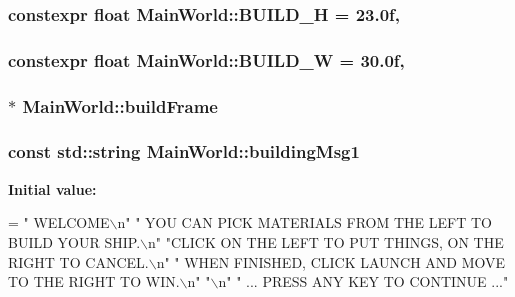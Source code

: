\subsubsection[{B\+U\+I\+L\+D\+\_\+\+H}]{\setlength{\rightskip}{0pt plus 5cm}constexpr float Main\+World\+::\+B\+U\+I\+L\+D\+\_\+\+H = 23.\+0f\hspace{0.3cm}{\ttfamily [static]}, {\ttfamily [private]}}\label{classMainWorld_abb38bf72b8a3c5ff6df3a43c7ebfba25}
\hypertarget{classMainWorld_a92c8b34eec78a999312c4b1d982d5f0c}{}
\subsubsection[{B\+U\+I\+L\+D\+\_\+\+W}]{\setlength{\rightskip}{0pt plus 5cm}constexpr float Main\+World\+::\+B\+U\+I\+L\+D\+\_\+\+W = 30.\+0f\hspace{0.3cm}{\ttfamily [static]}, {\ttfamily [private]}}\label{classMainWorld_a92c8b34eec78a999312c4b1d982d5f0c}
\hypertarget{classMainWorld_a10e4e51760423fa95cc57f4f5f8f5b76}{}
\subsubsection[{build\+Frame}]{$\ast$ Main\+World\+::build\+Frame\hspace{0.3cm}{\ttfamily [private]}}\label{classMainWorld_a10e4e51760423fa95cc57f4f5f8f5b76}
\hypertarget{classMainWorld_a12fc771468255ea67138459b8f80bb95}{}
\subsubsection[{building\+Msg1}]{\setlength{\rightskip}{0pt plus 5cm}const std\+::string Main\+World\+::building\+Msg1\hspace{0.3cm}{\ttfamily [private]}}\label{classMainWorld_a12fc771468255ea67138459b8f80bb95}
{\bfseries Initial value\+:}
\begin{DoxyCode}
=
            \textcolor{stringliteral}{"  WELCOME\(\backslash\)n"}
            \textcolor{stringliteral}{"  YOU CAN PICK MATERIALS FROM THE LEFT TO BUILD YOUR SHIP.\(\backslash\)n"}
            \textcolor{stringliteral}{"CLICK ON THE LEFT TO PUT THINGS, ON THE RIGHT TO CANCEL.\(\backslash\)n"}
            \textcolor{stringliteral}{"  WHEN FINISHED, CLICK LAUNCH AND MOVE TO THE RIGHT TO WIN.\(\backslash\)n"}
            \textcolor{stringliteral}{"\(\backslash\)n"}
            \textcolor{stringliteral}{"  ... PRESS ANY KEY TO CONTINUE ..."}
\end{DoxyCode}
\hypertarget{classMainWorld_ac33f26e815fc9f69e5119843dfc2b987}{}
